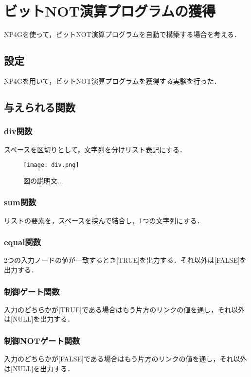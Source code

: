 \documentclass[exploratorypaper]{jsaiart} %
\begin{document}
\section{ビットNOT演算プログラムの獲得}
NP4Gを使って，ビットNOT演算プログラムを自動で構築する場合を考える．

\subsection{設定}
NP4Gを用いて，ビットNOT演算プログラムを獲得する実験を行った．

\subsection{与えられる関数}
\subsubsection{div関数}
スペースを区切りとして，文字列を分けリスト表記にする．

\begin{figure}[t]
    \begin{center}
        \texttt{[image: div.png]}
    \end{center}
    \capwidth=50mm %
    \caption{図の説明文... }
\end{figure}



\subsubsection{sum関数}
リストの要素を，スペースを挟んで結合し，1つの文字列にする．

\subsubsection{equal関数}
2つの入力ノードの値が一致するとき[TRUE]を出力する．それ以外は[FALSE]を出力する．
\subsubsection{制御ゲート関数}
入力のどちらかが[TRUE]である場合はもう片方のリンクの値を通し，それ以外は[NULL]を出力する．
\subsubsection{制御NOTゲート関数}
入力のどちらかが[FALSE]である場合はもう片方のリンクの値を通し，それ以外は[NULL]を出力する．
\end{document}
